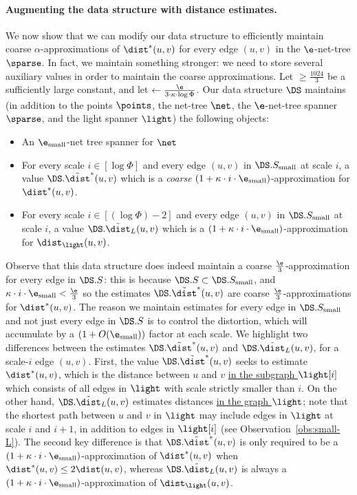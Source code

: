 \paragraph{Augmenting the data structure with distance estimates.} We now show that we can modify our data structure to efficiently maintain coarse $\alpha$-approximations of $\dist^*(u,v)$ for every edge $(u,v)$ in the $\e$-net-tree $\sparse$. In fact, we maintain something stronger: we need to store several auxiliary values in order to maintain the coarse approximations.
Let \EMPH{$\kappa$} $\ge \frac{1024}{3}$ be a sufficiently large constant, and let  $\gets \frac{\e}{3 \cdot \kappa \cdot \log \Phi}$.  Our data structure $\DS$ maintains (in addition to the points $\points$, the net-tree $\net$, the $\e$-net-tree spanner $\sparse$, and the light spanner $\light$) the following objects:
%
\begin{itemize}
    \item An  $\e_{\rm small}$-net tree spanner  for $\net$
    \item For every scale $i \in [\log \Phi]$ and every edge $(u,v)$ in $\DS.S_{\rm small}$ at scale $i$, a value \EMPH
    {$\DS.\tilde \dist^*(u,v)$} which is a \emph{coarse} $(1 + \kappa\cdot i \cdot \e_{\rm small})$-approximation for $\dist^*(u,v)$.
    \item For every scale $i \in [(\log \Phi) - 2]$ and every edge $(u,v)$ in $\DS.S_{\rm small}$ at scale $i$, a value \EMPH
    {$\DS.\tilde \dist_L(u,v)$} which is a $(1+\kappa\cdot i \cdot \e_{\rm small})$-approximation for $\dist_{\light}(u,v)$.
\end{itemize}
%
%
Observe that this data structure does indeed maintain a coarse $\frac \e 3$-approximation for every edge in $\DS.S$: this is because $\DS.S \subset \DS.S_{\rm small}$,
and $\kappa \cdot i \cdot \e_{\rm small} < \frac \e 3$ so the estimates $\DS.\tilde \dist^*(u,v)$ are coarse $\frac \e 3$-approximations for $\dist^*(u,v)$. The reason we maintain estimates for every edge in $\DS.S_{\rm small}$ and not just every edge in $\DS.S$ is to control the distortion, which will accumulate by a $(1+O(\e_{\rm small}))$ factor at each scale. 
%
We highlight two differences between the estimates $\DS.\tilde \dist^*(u,v)$ and $\DS.\tilde \dist_L(u,v)$, for a scale-$i$ edge $(u,v)$. First, the value $\DS.\tilde \dist^*(u,v)$ seeks to estimate $\dist^*(u,v)$, which is the distance between $u$ and $v$ \ul{in the subgraph $\light[i]$} which consists of all edges in $\light$ with scale strictly smaller than $i$. On the other hand, $\DS.\tilde \dist_L(u,v)$ estimates distances \ul{in the graph $\light$}; note that the shortest path between $u$ and $v$ in $\light$ may include edges in $\light$ at scale $i$ and $i+1$, in addition to edges in $\light[i]$ (see Observation~\ref{obs:small-L}). The second key difference is that $\DS.\tilde \dist^*(u,v)$ is only required to be a $(1+\kappa \cdot i \cdot \e_{\rm small})$-approximation of $\dist^*(u,v)$ when $\dist^*(u,v) \le 2 \dist(u,v)$, whereas $\DS.\tilde \dist_L(u,v)$ is always a $(1+\kappa \cdot i \cdot \e_{\rm small})$-approximation of $\dist_\light(u,v)$.
